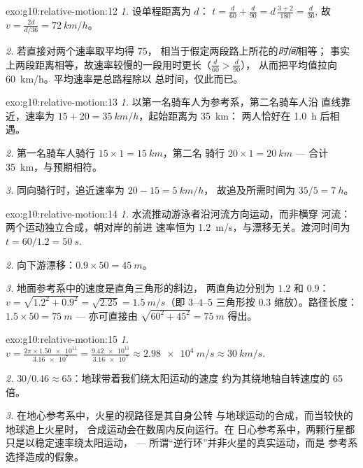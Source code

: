 \begin{solution}{exo:g10:relative-motion:12}
\emph{1.} 设单程距离为 $d$：
$t = \frac{d}{60} + \frac{d}{90} = d\,\frac{3 + 2}{180} = \frac{d}{36}$,
故 $v = \frac{2d}{d/36} = \qty{72}{km/h}$。

\emph{2.} 若直接对两个速率取平均得 $75$，
相当于假定两段路上所花的\emph{时间}相等；
事实上两段距离相等，故速率较慢的一段用时更长（$\frac{d}{60} > \frac{d}{90}$），
从而把平均值拉向 \qty{60}{km/h}。平均速率是总路程除以
总时间，仅此而已。
\end{solution}

\begin{solution}{exo:g10:relative-motion:13}
\emph{1.} 以第一名骑车人为参考系，第二名骑车人沿
直线靠近，速率为 $15 + 20 = \qty{35}{km/h}$，起始距离为 \qty{35}{km}：
两人恰好在 \qty{1.0}{h} 后相遇。

\emph{2.} 第一名骑车人骑行 $15 \times 1 = \qty{15}{km}$，第二名
骑行 $20 \times 1 = \qty{20}{km}$ --- 合计 \qty{35}{km}，与预期相符。

\emph{3.} 同向骑行时，追近速率为 $20 - 15 = \qty{5}{km/h}$，
故追及所需时间为 $35/5 = \qty{7}{h}$。
\end{solution}

\begin{solution}{exo:g10:relative-motion:14}
\emph{1.} 水流推动游泳者沿河流方向运动，而非横穿
河流：两个运动独立合成，朝对岸的前进
速率恒为 \qty{1.2}{m/s}，与漂移无关。渡河时间为
$t = 60/1.2 = \qty{50}{s}$.

\emph{2.} 向下游漂移：$0.9 \times 50 = \qty{45}{m}$。

\emph{3.} 地面参考系中的速度是直角三角形的斜边，
两直角边分别为 $1.2$ 和 $0.9$：
$v = \sqrt{1.2^2 + 0.9^2} = \sqrt{2.25} = \qty{1.5}{m/s}$（即 $3$--$4$--$5$
三角形按 $0.3$ 缩放）。路径长度：$1.5 \times 50 = \qty{75}{m}$
--- 亦可直接由 $\sqrt{60^2 + 45^2} = \qty{75}{m}$ 得出。
\end{solution}

\begin{solution}{exo:g10:relative-motion:15}
\emph{1.} $v = \frac{2\pi \times \num{1.50e11}}{\num{3.16e7}}
= \frac{\num{9.42e11}}{\num{3.16e7}} \approx \qty{2.98e4}{m/s}
\approx \qty{30}{km/s}$.

\emph{2.} $30 / 0.46 \approx 65$：地球带着我们绕太阳运动的速度
约为其绕地轴自转速度的 65 倍。

\emph{3.} 在地心参考系中，火星的视路径是其自身公转
与地球运动的合成，而当较快的地球追上火星时，
合成运动会在数周内反向运行。在
日心参考系中，两颗行星都只是以稳定速率绕太阳运动，
--- 所谓“逆行环”并非火星的真实运动，而是
参考系选择造成的假象。
\end{solution}

